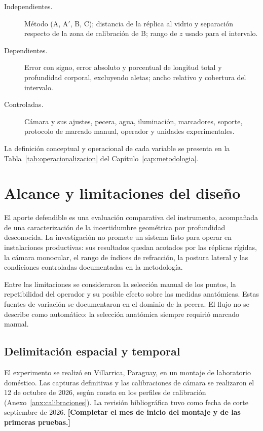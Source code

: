 \documentclass{report}
\newcommand{\Aprime}{A$'$}
\newcommand{\pend}[1]{\textbf{[#1]}}
\newcommand{\Ciudad}{Villarrica}
\begin{document}
\begin{description}
  \item[Independientes.] Método (A, \Aprime, B, C); distancia de la réplica al vidrio y separación respecto de la zona de calibración de B; rango de $z$ usado para el intervalo.
  \item[Dependientes.] Error con signo, error absoluto y porcentual de longitud total y profundidad corporal, excluyendo aletas; ancho relativo y cobertura del intervalo.
  \item[Controladas.] Cámara y sus ajustes, pecera, agua, iluminación, marcadores, soporte, protocolo de marcado manual, operador y unidades experimentales.
\end{description}

La definición conceptual y operacional de cada variable se presenta en la Tabla~\ref{tab:operacionalizacion} del Capítulo~\ref{cap:metodologia}.

\section{Alcance y limitaciones del diseño}

El aporte defendible es una evaluación comparativa del instrumento, acompañada de una caracterización de la incertidumbre geométrica por profundidad desconocida. La investigación no promete un sistema listo para operar en instalaciones productivas: sus resultados quedan acotados por las réplicas rígidas, la cámara monocular, el rango de índices de refracción, la postura lateral y las condiciones controladas documentadas en la metodología.

Entre las limitaciones se consideraron la selección manual de los puntos, la repetibilidad del operador y su posible efecto sobre las medidas anatómicas. Estas fuentes de variación se documentaron en el dominio de la pecera. El flujo no se describe como automático: la selección anatómica siempre requirió marcado manual.

\subsection{Delimitación espacial y temporal}

El experimento se realizó en \Ciudad, Paraguay, en un montaje de laboratorio doméstico. Las capturas definitivas y las calibraciones de cámara se realizaron el 12 de octubre de 2026, según consta en los perfiles de calibración (Anexo~\ref{anx:calibraciones}). La revisión bibliográfica tuvo como fecha de corte septiembre de 2026. \pend{Completar el mes de inicio del montaje y de las primeras pruebas.}
\end{document}
